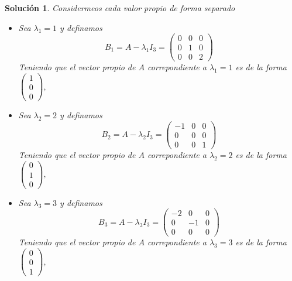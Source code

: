\documentclass[letterpaper]{article}
\newtheorem*{sol}{Solución}
\begin{document}
\begin{enumerate}
\begin{sol}
Considermeos cada valor propio de forma separado

\begin{itemize}
    \item Sea $\lambda_1 = 1$ y definamos
    \[
        B_1 = A - \lambda_1I_3 = 
        \begin{pmatrix}
            0 & 0 & 0\\
            0 & 1 & 0\\
            0 & 0 & 2
        \end{pmatrix}
    \]
    Teniendo que el vector propio de $A$ correpondiente a $\lambda_1 = 1$ es de la forma
    $
        \begin{pmatrix}
            1\\
            0\\
            0
        \end{pmatrix},
    $

    \item Sea $\lambda_2 = 2$ y definamos
    \[
        B_2 = A - \lambda_2I_3 = 
        \begin{pmatrix}
            -1 & 0 & 0\\
            0  & 0 & 0\\
            0  & 0 & 1
        \end{pmatrix}
    \]
    Teniendo que el vector propio de $A$ correpondiente a $\lambda_2 = 2$ es de la forma
    $
        \begin{pmatrix}
            0\\
            1\\
            0
        \end{pmatrix},
    $

    \item Sea $\lambda_3 = 3$ y definamos
    \[
        B_3 = A - \lambda_3I_3 = 
        \begin{pmatrix}
            -2 & 0  & 0\\
            0  & -1 & 0\\
            0  & 0  & 0
        \end{pmatrix}
    \]
    Teniendo que el vector propio de $A$ correpondiente a $\lambda_3 = 3$ es de la forma
    $
        \begin{pmatrix}
            0\\
            0\\
            1
        \end{pmatrix},
    $

\end{itemize}


\end{sol}
\end{enumerate}
\end{document}
